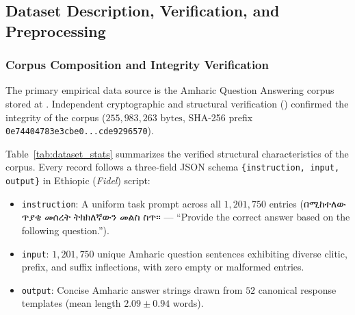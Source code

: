 \documentclass{interact}
\newcommand{\amharictext}[1]{\foreignlanguage{amharic}{\ethiopicfont #1}}
\begin{document}
\subsection{Dataset Description, Verification, and Preprocessing}
\label{subsec:dataset}

\subsubsection{Corpus Composition and Integrity Verification}

The primary empirical data source is the Amharic Question Answering corpus stored at . Independent cryptographic and structural verification () confirmed the integrity of the corpus ($255,983,263\text{ bytes}$, SHA-256 prefix \texttt{0e74404783e3cbe0...cde9296570}).

Table~\ref{tab:dataset_stats} summarizes the verified structural characteristics of the corpus. Every record follows a three-field JSON schema \texttt{\{instruction, input, output\}} in Ethiopic (\textit{Fidel}) script:
\begin{itemize}
    \item \texttt{instruction}: A uniform task prompt across all $1,201,750$ entries (\amharictext{በሚከተለው ጥያቄ መሰረት ትክክለኛውን መልስ ስጥ።} --- ``Provide the correct answer based on the following question.'').
    \item \texttt{input}: $1,201,750$ unique Amharic question sentences exhibiting diverse clitic, prefix, and suffix inflections, with zero empty or malformed entries.
    \item \texttt{output}: Concise Amharic answer strings drawn from $52$ canonical response templates (mean length $2.09 \pm 0.94$ words).
\end{itemize}
\end{document}
